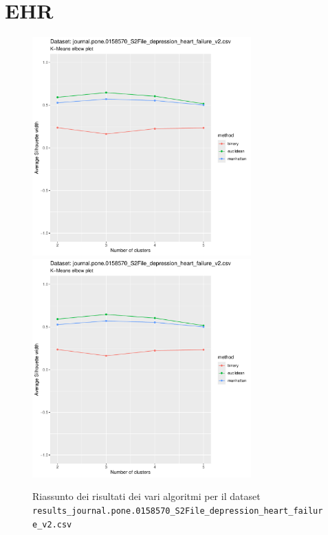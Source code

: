 \documentclass[12pt]{report}
\begin{document}
		\section{EHR}

			\begin{figure}[h]
				\centering
				\includegraphics[width = 0.75\textwidth, height = 0.45\textheight, page = 9]{
					results/results_journal.pone.0158570_S2File_depression_heart_failure_v2.csv.pdf
				}
				\includegraphics[width = 0.75\textwidth, height = 0.45\textheight, page = 10]{
					results/results_journal.pone.0158570_S2File_depression_heart_failure_v2.csv.pdf
				}
				\caption{Riassunto dei risultati dei vari algoritmi per il dataset
				\texttt{results\_journal.pone.0158570\_S2File\_depression\_heart\_failure\_v2.csv}}
				\label{fig:comp1}
			\end{figure}
\end{document}
